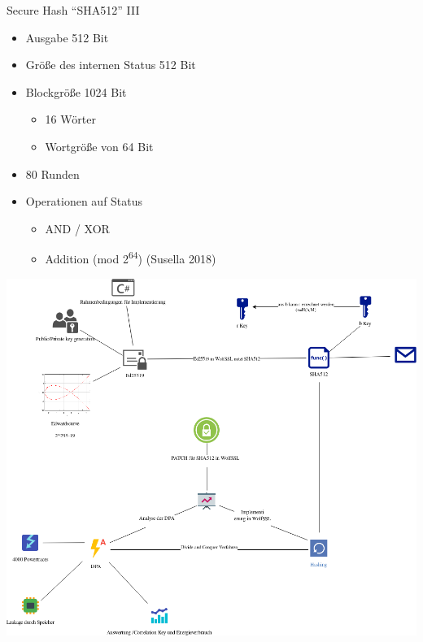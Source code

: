 \documentclass[
  9pt,
  ignorenonframetext,
  aspectratio=169,
]{beamer}
\providecommand{\tightlist}{%
  \setlength{\itemsep}{0pt}\setlength{\parskip}{0pt}}
\begin{document}
\begin{frame}{Secure Hash ``SHA512'' III}
\protect\hypertarget{secure-hash-sha512-iii}{}
\begin{itemize}
\tightlist
\item
  Ausgabe 512 Bit
\item
  Größe des internen Status 512 Bit
\item
  Blockgröße 1024 Bit

  \begin{itemize}
  \tightlist
  \item
    16 Wörter
  \item
    Wortgröße von 64 Bit
  \end{itemize}
\item
  80 Runden
\item
  Operationen auf Status

  \begin{itemize}
  \tightlist
  \item
    AND / XOR
  \item
    Addition (mod 2\textsuperscript{64}) (Susella 2018)
  \end{itemize}
\end{itemize}
\end{frame}

\begin{frame}{}
\protect\hypertarget{section-4}{}
\includegraphics{Abbildungen/ITSEC(1).png}
\end{frame}
\end{document}
